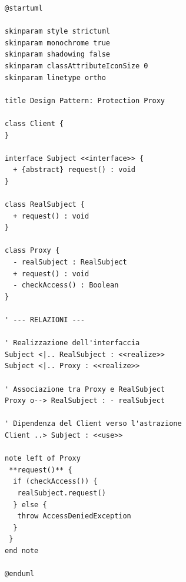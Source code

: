 \begin{verbatim}
@startuml

skinparam style strictuml
skinparam monochrome true
skinparam shadowing false
skinparam classAttributeIconSize 0
skinparam linetype ortho

title Design Pattern: Protection Proxy

class Client {
}

interface Subject <<interface>> {
  + {abstract} request() : void
}

class RealSubject {
  + request() : void
}

class Proxy {
  - realSubject : RealSubject
  + request() : void
  - checkAccess() : Boolean
}

' --- RELAZIONI ---

' Realizzazione dell'interfaccia
Subject <|.. RealSubject : <<realize>>
Subject <|.. Proxy : <<realize>>

' Associazione tra Proxy e RealSubject
Proxy o--> RealSubject : - realSubject

' Dipendenza del Client verso l'astrazione
Client ..> Subject : <<use>>

note left of Proxy
 **request()** {
  if (checkAccess()) {
   realSubject.request()
  } else {
   throw AccessDeniedException
  }
 }
end note

@enduml

\end{verbatim}